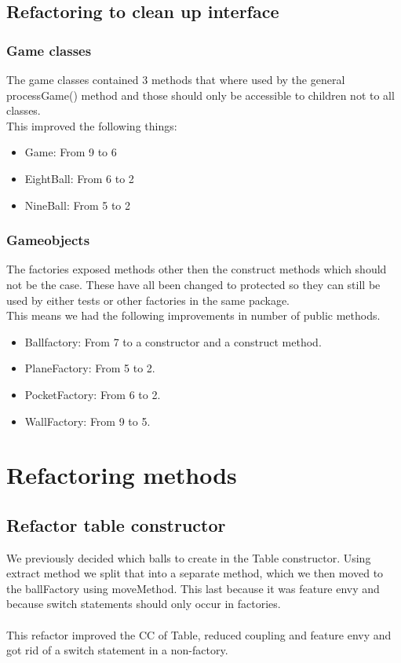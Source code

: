 \documentclass{article}
\begin{document}
	\subsection{Refactoring to clean up interface}
	\subsubsection{Game classes}
	The game classes contained 3 methods that where used by the general processGame() method and those should only be accessible to children not to all classes. 
	\\This improved the following things:
	\begin{itemize}
	\item Game: From 9 to 6
	\item EightBall: From 6 to 2
	\item NineBall: From 5 to 2
	\end{itemize}
	
	\subsubsection{Gameobjects}
	The factories exposed methods other then the construct methods which should not be the case.
	These have all been changed to protected so they can still be used by either tests or other factories in the same package.
	\\This means we had the following improvements in number of public methods.
	\begin{itemize}
		\item Ballfactory: From 7 to a constructor and a construct method.
		\item PlaneFactory: From 5 to 2.
		\item PocketFactory: From 6 to 2.
		\item WallFactory: From 9 to 5.
	\end{itemize}
\section{Refactoring methods}
	\subsection{Refactor table constructor}
	We previously decided which balls to create in the Table constructor. Using extract method we split that into a separate method, which we then moved to the ballFactory using moveMethod.
	This last because it was feature envy and because switch statements should only occur in factories.
	\\\\
	This refactor improved the CC of Table, reduced coupling and feature envy and got rid of a switch statement in a non-factory.
\end{document}
